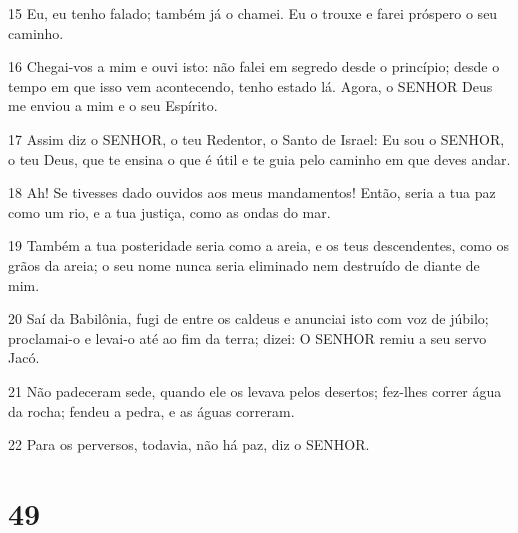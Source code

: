 \par 15 Eu, eu tenho falado; também já o chamei. Eu o trouxe e farei próspero o seu caminho.
\par 16 Chegai-vos a mim e ouvi isto: não falei em segredo desde o princípio; desde o tempo em que isso vem acontecendo, tenho estado lá. Agora, o SENHOR Deus me enviou a mim e o seu Espírito.
\par 17 Assim diz o SENHOR, o teu Redentor, o Santo de Israel: Eu sou o SENHOR, o teu Deus, que te ensina o que é útil e te guia pelo caminho em que deves andar.
\par 18 Ah! Se tivesses dado ouvidos aos meus mandamentos! Então, seria a tua paz como um rio, e a tua justiça, como as ondas do mar.
\par 19 Também a tua posteridade seria como a areia, e os teus descendentes, como os grãos da areia; o seu nome nunca seria eliminado nem destruído de diante de mim.
\par 20 Saí da Babilônia, fugi de entre os caldeus e anunciai isto com voz de júbilo; proclamai-o e levai-o até ao fim da terra; dizei: O SENHOR remiu a seu servo Jacó.
\par 21 Não padeceram sede, quando ele os levava pelos desertos; fez-lhes correr água da rocha; fendeu a pedra, e as águas correram.
\par 22 Para os perversos, todavia, não há paz, diz o SENHOR.

\chapter{49}


